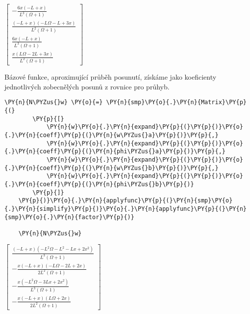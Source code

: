                 
    
    $\displaystyle \left[\begin{matrix}- \frac{6 x \left(- L + x\right)}{L^{3} \left(\Omega + 1\right)}\\\frac{\left(- L + x\right) \left(- L \Omega - L + 3 x\right)}{L^{2} \left(\Omega + 1\right)}\\\frac{6 x \left(- L + x\right)}{L^{3} \left(\Omega + 1\right)}\\\frac{x \left(L \Omega - 2 L + 3 x\right)}{L^{2} \left(\Omega + 1\right)}\end{matrix}\right]$

\vspace{0.3cm}
Bázové funkce, aproximující průběh posunutí, získáme jako koeficienty jednotlivých zobecnělých posunů z rovnice pro průhyb.
        
    
\begin{tcolorbox}[breakable, size=fbox, boxrule=1pt, pad at break*=1mm,colback=cellbackground, colframe=cellborder]
    \begin{Verbatim}[commandchars=\\\{\}]
    \PY{n}{N\PYZus{}w} \PY{o}{=} \PY{n}{smp}\PY{o}{.}\PY{n}{Matrix}\PY{p}{(}
        \PY{p}{[}
            \PY{n}{w}\PY{o}{.}\PY{n}{expand}\PY{p}{(}\PY{p}{)}\PY{o}{.}\PY{n}{coeff}\PY{p}{(}\PY{n}{w\PYZus{}a}\PY{p}{)}\PY{p}{,}
            \PY{n}{w}\PY{o}{.}\PY{n}{expand}\PY{p}{(}\PY{p}{)}\PY{o}{.}\PY{n}{coeff}\PY{p}{(}\PY{n}{phi\PYZus{}a}\PY{p}{)}\PY{p}{,}
            \PY{n}{w}\PY{o}{.}\PY{n}{expand}\PY{p}{(}\PY{p}{)}\PY{o}{.}\PY{n}{coeff}\PY{p}{(}\PY{n}{w\PYZus{}b}\PY{p}{)}\PY{p}{,}
            \PY{n}{w}\PY{o}{.}\PY{n}{expand}\PY{p}{(}\PY{p}{)}\PY{o}{.}\PY{n}{coeff}\PY{p}{(}\PY{n}{phi\PYZus{}b}\PY{p}{)}
        \PY{p}{]}
    \PY{p}{)}\PY{o}{.}\PY{n}{applyfunc}\PY{p}{(}\PY{n}{smp}\PY{o}{.}\PY{n}{simplify}\PY{p}{)}\PY{o}{.}\PY{n}{applyfunc}\PY{p}{(}\PY{n}{smp}\PY{o}{.}\PY{n}{factor}\PY{p}{)}
    
    \PY{n}{N\PYZus{}w}
    \end{Verbatim}
\end{tcolorbox}
     
                
    
    $\displaystyle \left[\begin{matrix}\frac{\left(- L + x\right) \left(- L^{2} \Omega - L^{2} - L x + 2 x^{2}\right)}{L^{3} \left(\Omega + 1\right)}\\- \frac{x \left(- L + x\right) \left(- L \Omega - 2 L + 2 x\right)}{2 L^{2} \left(\Omega + 1\right)}\\- \frac{x \left(- L^{2} \Omega - 3 L x + 2 x^{2}\right)}{L^{3} \left(\Omega + 1\right)}\\- \frac{x \left(- L + x\right) \left(L \Omega + 2 x\right)}{2 L^{2} \left(\Omega + 1\right)}\end{matrix}\right]$
    
